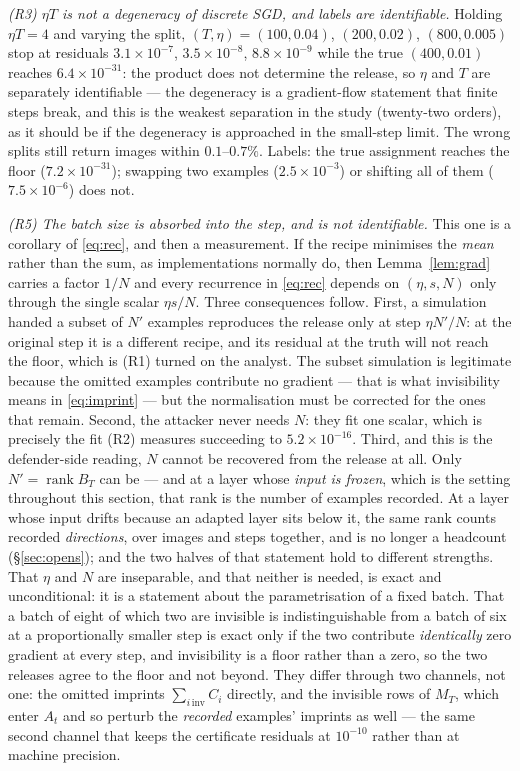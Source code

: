 \emph{(R3) $\eta T$ is not a degeneracy of discrete SGD, and labels are
identifiable.} Holding $\eta T=4$ and varying the split, $(T,\eta)=(100,0.04)$,
$(200,0.02)$, $(800,0.005)$ stop at residuals $3.1\times10^{-7}$,
$3.5\times10^{-8}$, $8.8\times10^{-9}$ while the true $(400,0.01)$ reaches
$6.4\times10^{-31}$: the product does not determine the release, so $\eta$ and
$T$ are separately identifiable — the degeneracy is a gradient-flow statement
that finite steps break, and this is the weakest separation in the study
(twenty-two orders), as it should be if the degeneracy is approached in the
small-step limit. The wrong splits still return images within
$0.1$--$0.7\%$. Labels: the true assignment reaches the floor
($7.2\times10^{-31}$); swapping two examples ($2.5\times10^{-3}$) or shifting
all of them ($7.5\times10^{-6}$) does not.

\emph{(R5) The batch size is absorbed into the step, and is not
identifiable.} This one is a corollary of \eqref{eq:rec}, and then a
measurement. If the recipe minimises the \emph{mean} rather than the sum, as
implementations normally do, then Lemma~\ref{lem:grad} carries a factor $1/N$
and every recurrence in \eqref{eq:rec} depends on $(\eta,s,N)$ only through
the single scalar $\eta s/N$. Three consequences follow. First, a simulation
handed a subset of $N'$ examples reproduces the release only at step $\eta
N'/N$: at the original step it is a different recipe, and its residual at the
truth will not reach the floor, which is (R1) turned on the analyst. The
subset simulation is legitimate because the omitted examples contribute no
gradient --- that is what invisibility means in \eqref{eq:imprint} --- but the
normalisation must be corrected for the ones that remain. Second, the attacker
never needs $N$: they fit one scalar, which is precisely the fit (R2) measures
succeeding to $5.2\times10^{-16}$. Third, and this is the defender-side
reading, $N$ cannot be recovered from the release at all. Only $N'=\operatorname{rank}B_T$
can be --- and at a layer whose \emph{input is frozen}, which is the setting
throughout this section, that rank is the number of examples recorded. At a
layer whose input drifts because an adapted layer sits below it, the same rank
counts recorded \emph{directions}, over images and steps together, and is no
longer a headcount (\S\ref{sec:opens});
and the two halves of that statement hold to different strengths. That $\eta$
and $N$ are inseparable, and that neither is needed, is exact and
unconditional: it is a statement about the parametrisation of a fixed batch.
That a batch of eight of which two are invisible is indistinguishable from a
batch of six at a proportionally smaller step is exact only if the two
contribute \emph{identically} zero gradient at every step, and invisibility is
a floor rather than a zero, so the two releases agree to the floor and not
beyond. They differ through two channels, not one: the omitted imprints
$\sum_{i\,\mathrm{inv}}C_i$ directly, and the invisible rows of $M_T$, which
enter $A_t$ and so perturb the \emph{recorded} examples' imprints as well ---
the same second channel that keeps the certificate residuals at $10^{-10}$
rather than at machine precision.

